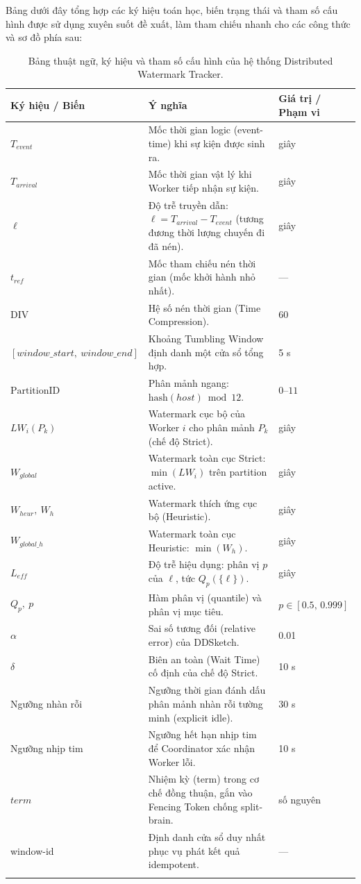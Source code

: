 \documentclass[12pt,a4paper]{article}
\begin{document}
Bảng dưới đây tổng hợp các ký hiệu toán học, biến trạng thái và tham số cấu hình được sử dụng xuyên suốt đề xuất, làm tham chiếu nhanh cho các công thức và sơ đồ phía sau:

\begin{longtable}{p{} p{} p{}}
\toprule
\textbf{Ký hiệu / Biến} & \textbf{Ý nghĩa} & \textbf{Giá trị / Phạm vi} \\
\midrule
\endhead
$T_{event}$ & Mốc thời gian logic (event-time) khi sự kiện được sinh ra. & giây \\
$T_{arrival}$ & Mốc thời gian vật lý khi Worker tiếp nhận sự kiện. & giây \\
$\ell$ & Độ trễ truyền dẫn: $\ell = T_{arrival} - T_{event}$ (tương đương thời lượng chuyến đi đã nén). & giây \\
$t_{ref}$ & Mốc tham chiếu nén thời gian (mốc khởi hành nhỏ nhất). & --- \\
$\text{DIV}$ & Hệ số nén thời gian (Time Compression). & 60 \\
$[window\_start,\ window\_end]$ & Khoảng Tumbling Window định danh một cửa sổ tổng hợp. & 5 s \\
$\text{PartitionID}$ & Phân mảnh ngang: $\text{hash}(host) \bmod 12$. & $0$--$11$ \\
$LW_i(P_k)$ & Watermark cục bộ của Worker $i$ cho phân mảnh $P_k$ (chế độ Strict). & giây \\
$W_{global}$ & Watermark toàn cục Strict: $\min(LW_i)$ trên partition active. & giây \\
$W_{heur},\ W_h$ & Watermark thích ứng cục bộ (Heuristic). & giây \\
$W_{global\_h}$ & Watermark toàn cục Heuristic: $\min(W_h)$. & giây \\
$L_{eff}$ & Độ trễ hiệu dụng: phân vị $p$ của $\ell$, tức $Q_p(\{\ell\})$. & giây \\
$Q_p,\ p$ & Hàm phân vị (quantile) và phân vị mục tiêu. & $p \in [0.5,\, 0.999]$ \\
$\alpha$ & Sai số tương đối (relative error) của DDSketch. & 0.01 \\
$\delta$ & Biên an toàn (Wait Time) cố định của chế độ Strict. & 10 s \\
Ngưỡng nhàn rỗi & Ngưỡng thời gian đánh dấu phân mảnh nhàn rỗi tường minh (explicit idle). & 30 s \\
Ngưỡng nhịp tim & Ngưỡng hết hạn nhịp tim để Coordinator xác nhận Worker lỗi. & 10 s \\
$term$ & Nhiệm kỳ (term) trong cơ chế đồng thuận, gắn vào Fencing Token chống split-brain. & số nguyên \\
window-id & Định danh cửa sổ duy nhất phục vụ phát kết quả idempotent. & --- \\
\bottomrule
\caption{Bảng thuật ngữ, ký hiệu và tham số cấu hình của hệ thống Distributed Watermark Tracker.}
\label{tab:glossary}
\end{longtable}
\end{document}
